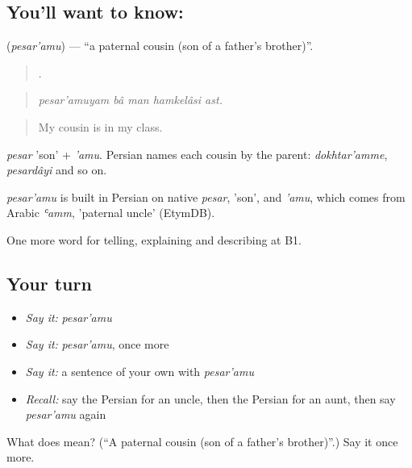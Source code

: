 \subsection*{You'll want to know: }
\textbf{} (\emph{pesar'amu}) — \textquotedblleft{}a paternal cousin (son of a father's brother)\textquotedblright{}.

\begin{quote}
    .
\end{quote}

\begin{quote}
\emph{pesar'amuyam bâ man hamkelâsi ast.}
\end{quote}

\begin{quote}
My cousin is in my class.
\end{quote}

\emph{pesar} 'son' + \emph{'amu}. Persian names each cousin by the parent: \emph{dokhtar'amme}, \emph{pesardâyi} and so on.

\begin{cousinweb}
\emph{pesar'amu} is built in Persian on native \emph{pesar}, 'son', and \emph{'amu}, which comes from Arabic \emph{ʿamm}, 'paternal uncle' (EtymDB).
\end{cousinweb}

\begin{grammarlens}[title={What you've built}]
One more word for telling, explaining and describing at B1.
\end{grammarlens}

\subsection*{Your turn}
\begin{itemize}
\raggedright
  \item \emph{Say it:} \emph{pesar'amu}
  \item \emph{Say it:} \emph{pesar'amu}, once more
  \item \emph{Say it:} a sentence of your own with \emph{pesar'amu}
  \item \emph{Recall:} say the Persian for an uncle, then the Persian for an aunt, then say \emph{pesar'amu} again
\end{itemize}

\begin{tcolorbox}[breakable,colback=teal!4,colframe=teal!35!black,title={Before you move on}]
What does  mean? (\textquotedblleft{}A paternal cousin (son of a father's brother)\textquotedblright{}.) Say it once more.
\end{tcolorbox}
